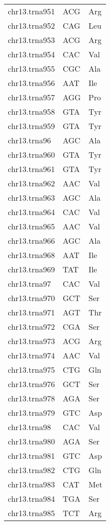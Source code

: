 \begin{longtable}{@{}l>{\collectcell\anticodon}l<{\endcollectcell}l@{}}
    chr13.trna951 & ACG & Arg \\
    chr13.trna952 & CAG & Leu \\
    chr13.trna953 & ACG & Arg \\
    chr13.trna954 & CAC & Val \\
    chr13.trna955 & CGC & Ala \\
    chr13.trna956 & AAT & Ile \\
    chr13.trna957 & AGG & Pro \\
    chr13.trna958 & GTA & Tyr \\
    chr13.trna959 & GTA & Tyr \\
    chr13.trna96 & AGC & Ala \\
    chr13.trna960 & GTA & Tyr \\
    chr13.trna961 & GTA & Tyr \\
    chr13.trna962 & AAC & Val \\
    chr13.trna963 & AGC & Ala \\
    chr13.trna964 & CAC & Val \\
    chr13.trna965 & AAC & Val \\
    chr13.trna966 & AGC & Ala \\
    chr13.trna968 & AAT & Ile \\
    chr13.trna969 & TAT & Ile \\
    chr13.trna97 & CAC & Val \\
    chr13.trna970 & GCT & Ser \\
    chr13.trna971 & AGT & Thr \\
    chr13.trna972 & CGA & Ser \\
    chr13.trna973 & ACG & Arg \\
    chr13.trna974 & AAC & Val \\
    chr13.trna975 & CTG & Gln \\
    chr13.trna976 & GCT & Ser \\
    chr13.trna978 & AGA & Ser \\
    chr13.trna979 & GTC & Asp \\
    chr13.trna98 & CAC & Val \\
    chr13.trna980 & AGA & Ser \\
    chr13.trna981 & GTC & Asp \\
    chr13.trna982 & CTG & Gln \\
    chr13.trna983 & CAT & Met \\
    chr13.trna984 & TGA & Ser \\
    chr13.trna985 & TCT & Arg \\

\end{longtable}
